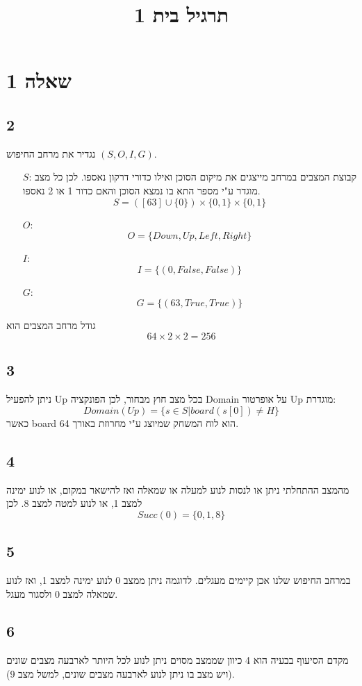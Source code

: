\documentclass{article}
\title{תרגיל בית 1}
\date{}
\begin{document}
\maketitle
\newpage
\section{שאלה 1}
\subsection*{2}
נגדיר את מרחב החיפוש 
$(S, O, I, G)$.
\begin{itemize}
\item[$S$:]
קבוצת המצבים במרחב מייצגים את מיקום הסוכן ואילו כדורי דרקון נאספו. לכן כל מצב מוגדר ע"י מספר התא בו נמצא הסוכן והאם כדור 1 או 2 נאספו.
$$S = ([63]\cup\{0\}) \times \{0,1\} \times \{0, 1\}$$
\item[$O$:]
$$O = \{Down, Up, Left, Right\}$$
\item[$I$:]
$$I = \{(0, False, False)\}$$
\item[$G$:]
$$G = \{(63, True, True)\}$$
\end{itemize}
גודל מרחב המצבים הוא
$$64 \times 2 \times 2 = 256$$

\subsection*{3}
ניתן להפעיל Up בכל מצב חוץ מבחור, לכן הפונקציה Domain על אופרטור Up מוגדרת:
$$Domain(Up) = \{s \in S| board(s[0]) \neq H\}$$
כאשר board הוא לוח המשחק שמיוצג ע"י מחרוזת באורך 64.

\subsection*{4}
מהמצב ההתחלתי ניתן או לנסות לנוע למעלה או שמאלה ואז להישאר במקום, או לנוע ימינה למצב 1, או לנוע למטה למצב 8. לכן
$$Succ(0) = \{0, 1, 8\}$$

\subsection*{5}
במרחב החיפוש שלנו אכן קיימים מעגלים. לדוגמה ניתן ממצב 0 לנוע ימינה למצב 1, ואז לנוע שמאלה למצב 0 ולסגור מעגל.
\subsection*{6}
מקדם הסיעוף בבעיה הוא 4 כיוון שממצב מסוים ניתן לנוע לכל היותר לארבעה מצבים שונים (ויש מצב בו ניתן לנוע לארבעה מצבים שונים, למשל מצב 9).
\end{document}
